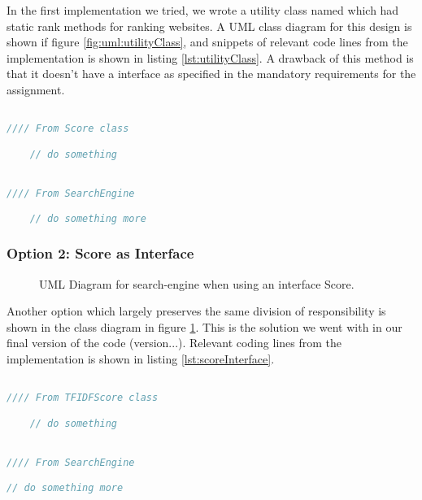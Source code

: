 In the first implementation we tried, we wrote a utility class named  which had static rank methods for ranking websites.   
A UML class diagram for this design is shown if figure \ref{fig:uml:utilityClass}, and snippets of relevant code lines from the implementation is shown in listing \ref{lst:utilityClass}. 
A drawback of this method is that it doesn't have a  interface as specified in the mandatory requirements for the assignment.  

\begin{lstlisting}[language=Java, caption=This is a code example., label=lst:utilityClass]

//// From Score class 

	// do something	


//// From SearchEngine 

	// do something more

\end{lstlisting}


\subsubsection{Option 2: Score as Interface}
\begin{figure}[t]
	\centering
	\caption{UML Diagram for search-engine when using an interface Score.}
	\label{fig:uml:score-as-interface}
\end{figure}

Another option which largely preserves the same division of responsibility is shown in the class diagram in figure \ref{fig:uml:score-as-interface}.    
This is the solution we went with in our final version of the code (version...). Relevant coding lines from the implementation is shown in listing \ref{lst:scoreInterface}.

\begin{lstlisting}[language=Java, caption=This is a code example., label=lst:scoreInterface]

//// From TFIDFScore class 

	// do something	


//// From SearchEngine 

// do something more

\end{lstlisting}




